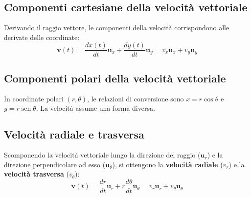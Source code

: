 \documentclass[12pt]{article}
\begin{document}
\vspace{0.3cm}
\begin{center}
\end{center}
\vspace{0.3cm}

\subsection*{Componenti cartesiane della velocità vettoriale}
Derivando il raggio vettore, le componenti della velocità corrispondono alle derivate delle coordinate:
\begin{equation}
\mathbf{v}(t) = \frac{dx(t)}{dt}\mathbf{u}_x + \frac{dy(t)}{dt}\mathbf{u}_y = v_x\mathbf{u}_x + v_y\mathbf{u}_y
\end{equation}

\subsection*{Componenti polari della velocità vettoriale}
In coordinate polari $(r, \theta)$, le relazioni di conversione sono $x = r\cos\theta$ e $y = r\operatorname{sen}\theta$. La velocità assume una forma diversa.

\subsection*{Velocità radiale e trasversa}
Scomponendo la velocità vettoriale lungo la direzione del raggio ($\mathbf{u}_r$) e la direzione perpendicolare ad esso ($\mathbf{u}_\theta$), si ottengono la \textbf{velocità radiale} ($v_r$) e la \textbf{velocità trasversa} ($v_\theta$):
\begin{equation}
\mathbf{v}(t) = \frac{dr}{dt}\mathbf{u}_r + r\frac{d\theta}{dt}\mathbf{u}_\theta = v_r\mathbf{u}_r + v_\theta\mathbf{u}_\theta
\end{equation}
\end{document}
